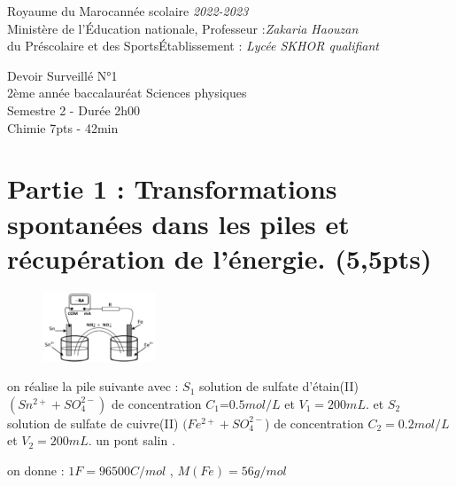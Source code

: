 \documentclass[12pt]{article}
\newcommand\headerMe[2]{\noindent{}#1\hfill#2}
\begin{document}
\headerMe{Royaume du Maroc}{année scolaire \emph{2022-2023}}\\
\headerMe{Ministère de l'Éducation nationale, }{  Professeur :\emph{Zakaria Haouzan}}\\
\headerMe{du Préscolaire et des Sports}{Établissement : \emph{Lycée SKHOR qualifiant}}\\
\vspace{-1cm}
\begin{center}
Devoir Surveillé  N°1 \\
    2ème année baccalauréat Sciences physiques\\
Semestre 2 - Durée 2h00
\\
    \vspace{.2cm}
\hrulefill
\Large{Chimie 7pts - 42min}
\hrulefill\\

\end{center}
 \section*{Partie 1 : Transformations spontanées dans les piles et récupération de
l’énergie. \dotfill(5,5pts) }
\begin{figure}
	\vspace{-1.2cm}
\begin{center}
  \includegraphics[width=0.3\textwidth]{./ex_00.png}
\end{center}
\end{figure}

on réalise la pile suivante avec : $S_1$ solution de sulfate d'étain(II) \\$(Sn^{2+} + SO_4^{2-})$ de concentration $C_1$=$0.5mol/L$ et $V_1=200mL$.
et  $S_2$ \\solution de sulfate de cuivre(II) $(Fe^{2+} + SO_4^{2-}$) de concentration $C_2=0.2mol/L$ \\et $V_2=200mL$. un pont salin .

on donne : $1F=96500 C/mol$ , $M(Fe)=56g/mol$
\end{document}
